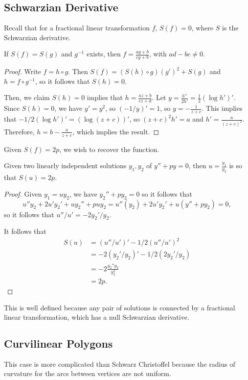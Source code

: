 \documentclass[12pt]{scrartcl}
\begin{document}
\subsection{Schwarzian Derivative}
Recall that for a fractional linear transformation $f$, $S(f) = 0$, where $S$ is the Schwarzian derivative.  
\begin{proposition} If $S(f) = S(g)$ and $g^{-1}$ exists, then $f = \frac{ag + b}{cg + b}$, with $ad - bc \ne 0$.
\end{proposition}
\begin{proof}
Write $f = h \circ g$.  Then $S(f) = (S(h) \circ g )(g')^2 + S(g)$ and $h = f \circ g^{-1}$, so it follows that $S(h) = 0$.

Then, we claim $S(h) = 0$ implies that $h = \frac{az + b}{cz + d}$.  Let $y = \frac{h''}{2h'} = \frac{1}{2} (\log h' )'$.  Since $S(h) = 0$, we have $y' = y^2$, so $(-1/y)' = 1$, so $y = -\frac{1}{z + c}$.   This implies that $-1/2(\log h')' = (\log(z + c))'$, so $(z + c)^2h' = a$ and $h' = \frac{a}{(z + c)^2}$.  Therefore, $h = b - \frac{a}{z + c}$, which implies the result.
\end{proof}

Given $S(f) =2p$, we wish to recover the function.  

\begin{fact} Given two linearly independent solutions $y_1, y_2$ of $y'' + py = 0$, then $u=  \frac{y_1}{y_2}$ is so that $S(u) = 2p$.
\end{fact} 
\begin{proof}
Given $y_1 = uy_2$, we have $y_2'' + py_2 = 0$ so it follows that 
$$u'' y_2+ 2u'y_2' + uy_2'' + puy_2 = u''(y_2) + 2u'y_2' + u(y'' + py_2) = 0,$$
so it follows that $u''/u' = -2y_2'/y_2$.  

It follows that 
\begin{align*}
S(u) &= (u''/u')' -1/2 (u''/u')^2 \\
&= -2 (y_2'/y_2)' - 1/2 (2y_2'/y_2) \\
&= -2 \frac{y_2''y_2}{y_2^2} \\
&= 2p.
\end{align*}
\end{proof}
\begin{remark} This is well defined because any pair of solutions is connected by a fractional linear transformation, which has a null Schwarzian derivative.  
\end{remark}
\subsection{Curvilinear Polygons}
This case is more complicated than Schwarz Christoffel because the radius of curvature for the arcs between vertices are not uniform.  
\end{document}

